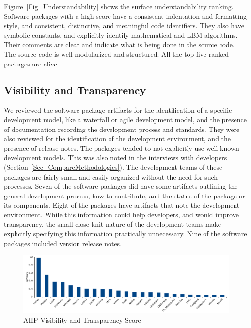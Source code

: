 \documentclass[final, 3p, times, authoryear]{elsarticle}
\begin{document}
Figure~\ref{Fig_Understandability} shows the surface understandability ranking.
Software packages with a high score have a consistent indentation and formatting
style, and consistent, distinctive, and meaningful code identifiers. They also
have symbolic constants, and explicitly identify mathematical and LBM
algorithms. Their comments are clear and indicate what is being done in the
source code. The source code is well modularized and structured. All the top
five ranked packages are alive.

\subsection{Visibility and Transparency}

We reviewed the software package artifacts for the identification of a specific
development model, like a waterfall or agile development model, and the presence
of documentation recording the development process and standards. They were also
reviewed for the identification of the development environment, and the presence
of release notes. The packages tended to not explicitly use well-known
development models. This was also noted in the interviews with developers
(Section~\ref{Sec_CompareMethodologies}). The development teams of these
packages are fairly small and easily organized without the need for such
processes. Seven of the software packages did have some artifacts outlining the
general development process, how to contribute, and the status of the package or
its components. Eight of the packages have artifacts that note the development
environment. While this information could help developers, and would improve
transparency, the small close-knit nature of the development teams make
explicitly specifying this information practically unnecessary. Nine of the
software packages included version release notes.

\begin{figure}[h!]
	\begin{center}
		\includegraphics[width=1.0\textwidth]{./figures/visibilitytransparency_chart.pdf}
		\caption{AHP Visibility and Transparency Score}
		\label{Fig_VisibilityTransparency}
	\end{center}
\end{figure}
\end{document}

